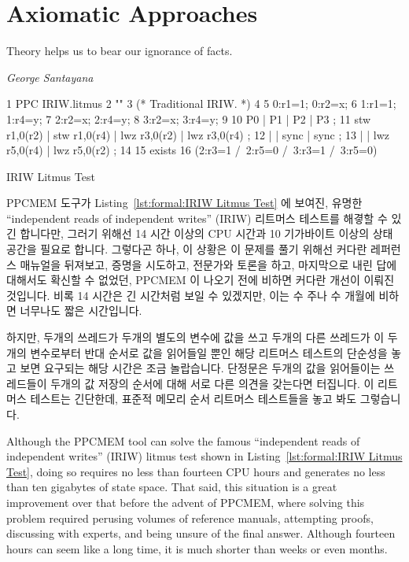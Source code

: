 
\section{Axiomatic Approaches}
\label{sec:formal:Axiomatic Approaches}
%
\epigraph{Theory helps us to bear our ignorance of facts.}
	{\emph{George Santayana}}

\begin{listing*}[tb]
{ \scriptsize
\begin{verbbox}
 1 PPC IRIW.litmus
 2 ""
 3 (* Traditional IRIW. *)
 4 {
 5 0:r1=1; 0:r2=x;
 6 1:r1=1;         1:r4=y;
 7         2:r2=x; 2:r4=y;
 8         3:r2=x; 3:r4=y;
 9 }
10 P0           | P1           | P2           | P3           ;
11 stw r1,0(r2) | stw r1,0(r4) | lwz r3,0(r2) | lwz r3,0(r4) ;
12              |              | sync         | sync         ;
13              |              | lwz r5,0(r4) | lwz r5,0(r2) ;
14 
15 exists
16 (2:r3=1 /\ 2:r5=0 /\ 3:r3=1 /\ 3:r5=0)
\end{verbbox}
}
\centering
\theverbbox
\caption{IRIW Litmus Test}
\label{lst:formal:IRIW Litmus Test}
\end{listing*}

PPCMEM 도구가
Listing~\ref{lst:formal:IRIW Litmus Test} 에 보여진,
유명한 ``independent reads of independent writes'' (IRIW) 리트머스 테스트를
해곃할 수 있긴 합니다만, 그러기 위해선 14 시간 이상의 CPU 시간과 10 기가바이트
이상의 상태공간을 필요로 합니다.
그렇다곤 하나, 이 상황은 이 문제를 풀기 위해선 커다란 레퍼런스 매뉴얼을
뒤져보고, 증명을 시도하고, 전문가와 토론을 하고, 마지막으로 내린 답에 대해서도
확신할 수 없었던, PPCMEM 이 나오기 전에 비하면 커다란 개선이 이뤄진 것입니다.
비록 14 시간은 긴 시간처럼 보일 수 있겠지만, 이는 수 주나 수 개월에 비하면
너무나도 짧은 시간입니다.

하지만, 두개의 쓰레드가 두개의 별도의 변수에 값을 쓰고 두개의 다른 쓰레드가 이
두개의 변수로부터 반대 순서로 값을 읽어들일 뿐인 해당 리트머스 테스트의
단순성을 놓고 보면 요구되는 해당 시간은 조금 놀랍습니다.
단정문은 두개의 값을 읽어들이는 쓰레드들이 두개의 값 저장의 순서에 대해 서로
다른 의견을 갖는다면 터집니다.
이 리트머스 테스트는 긴단한데, 표준적 메모리 순서 리트머스 테스트들을 놓고 봐도
그렇습니다.
\iffalse

Although the PPCMEM tool can solve the famous ``independent reads of
independent writes'' (IRIW) litmus test shown in
Listing~\ref{lst:formal:IRIW Litmus Test}, doing so requires no less than
fourteen CPU hours and generates no less than ten gigabytes of state space.
That said, this situation is a great improvement over that before the advent
of PPCMEM, where solving this problem required perusing volumes of
reference manuals, attempting proofs, discussing with experts, and
being unsure of the final answer.
Although fourteen hours can seem like a long time, it is much shorter
than weeks or even months.

